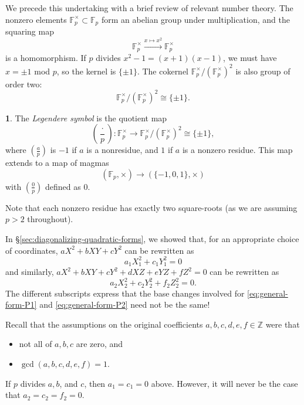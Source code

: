 \documentclass[10pt,a4paper]{amsart}
\numberwithin{equation}{section}
\numberwithin{figure}{section}
\theoremstyle{definition}
\theoremstyle{remark}
\theoremstyle{plain}
\theoremstyle{plain}
\theoremstyle{definition}
\newtheorem{defn}{\protect\definitionname}[section]
\theoremstyle{plain}
\theoremstyle{plain}
\providecommand{\definitionname}{Definition}
\newcommand{\legendre}[2]{\genfrac{(}{)}{}{}{#1}{#2}}
\newcommand{\F}{\mathbb{F}}
\newcommand{\Z}{\mathbb{Z}}
\begin{document}
    We precede this undertaking with a brief review of relevant number theory.
    The nonzero elements $\F_p^\times \subset \F_p$ form an abelian
    group under multiplication, and the squaring map 
    \[ \F^\times_p \xrightarrow{x \mapsto x^2} \F^\times_p \] 
    is a homomorphism. If $p$ divides $x^2 - 1 = (x+1)(x-1)$, we must have 
    $x = \pm 1$ mod $p$, so the kernel is $\{\pm 1\}$. 
    The cokernel $\F_p^\times / (\F_p^\times)^2$ is also group of order two: 
    \[ \F_p^\times / (\F_p^\times)^2 \cong \{\pm 1\}.  \]
    \begin{defn}
        The \emph{Legendere symbol} is the quotient map    
        \[ \legendre{\cdot}{p}: 
            \F_p^\times \to \F_p^\times / (\F_p^\times)^2 \cong \{\pm 1\}, \]
        where $\legendre{a}{p}$ is $-1$ if $a$ is a nonresidue,
        and $1$ if $a$ is a nonzero residue. This map extends to a map of magmas
        \[ (\F_p,\times) \to (\{-1,0,1\}, \times) \]
        with $\legendre{0}{p}$ defined as $0$.
    \end{defn}
    
    Note that each nonzero residue has exactly two square-roots (as we are assuming
    $p > 2$ throughout).

    In \S\ref{sec:diagonalizing-quadratic-forms}, we showed that, for an
    appropriate choice of coordinates, $aX^2 + bXY + cY^2$ can be rewritten as
    \begin{equation}\label{eq:general-form-P1} 
        a_1 X_1^2 + c_1 Y_1^2 = 0
    \end{equation} 
    and similarly, $aX^2 + bXY + cY^2 + dXZ + eYZ + fZ^2 = 0$ can be
    rewritten as 
    \begin{equation}\label{eq:general-form-P2} 
        a_2 X_2^2 + c_2 Y_2^2 + f_2 Z_2^2 = 0.
    \end{equation}
    The different subscripts express that the base
    changes involved for \eqref{eq:general-form-P1} and \eqref{eq:general-form-P2}
    need not be the same!

    Recall that the assumptions on the original coefficients 
    $a,b,c,d,e,f \in \Z$ were that 
    \begin{itemize} 
        \item not all of $a,b,c$ are zero, and
        \item $\gcd(a,b,c,d,e,f) = 1$.  
    \end{itemize} 
    If $p$ divides $a,b$, and $c$, then $a_1 = c_1 = 0$ above. However, 
    it will never be the case that $a_2 = c_2 = f_2 = 0$.
\end{document}
